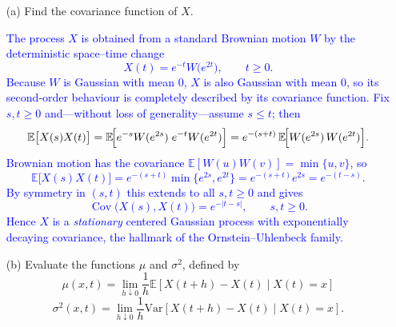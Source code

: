 \documentclass{article}
\begin{document}
\begin{enumerate}
    \item[(a)] Find the covariance function of $X$.

    \textcolor{blue}{
The process $X$ is obtained from a standard Brownian motion $W$ by the deterministic space–time change  
$$
X(t)=e^{-t}W\!\bigl(e^{2t}\bigr),\qquad t\ge 0.
$$
Because $W$ is Gaussian with mean $0$, $X$ is also Gaussian with mean $0$, so its second‑order behaviour is completely described by its covariance function.  Fix $s,t\ge 0$ and—without loss of generality—assume $s\le t$; then  
$$
\mathbb{E}\bigl[X(s)X(t)\bigr]
=\mathbb{E}\!\Bigl[e^{-s}W(e^{2s})\;e^{-t}W(e^{2t})\Bigr]
=e^{-(s+t)}\,
\mathbb{E}\!\Bigl[W(e^{2s})\,W(e^{2t})\Bigr].
$$
Brownian motion has the covariance $\mathbb{E}[W(u)W(v)]=\min\{u,v\}$, so  
$$
\mathbb{E}\bigl[X(s)X(t)\bigr]
=e^{-(s+t)}\min\!\bigl\{e^{2s},e^{2t}\bigr\}
=e^{-(s+t)}e^{2s}
=e^{-(t-s)}.
$$
By symmetry in $(s,t)$ this extends to all $s,t\ge 0$ and gives  
$$
\boxed{\;\operatorname{Cov}\bigl(X(s),X(t)\bigr)=e^{-|t-s|},\qquad s,t\ge 0.\;}
$$
Hence $X$ is a \emph{stationary} centered Gaussian process with exponentially decaying covariance, the hallmark of the Ornstein–Uhlenbeck family.
    }

    \item[(b)] Evaluate the functions $\mu$ and $\sigma^2$, defined by
    \[
    \mu(x,t) = \lim_{h \downarrow 0} \frac{1}{h} \mathbb{E}[X(t+h) - X(t) \mid X(t) = x]
    \]
    \[
    \sigma^2(x,t) = \lim_{h \downarrow 0} \frac{1}{h} \mathrm{Var}[X(t+h) - X(t) \mid X(t) = x].
    \]


\end{enumerate}
\end{document}
